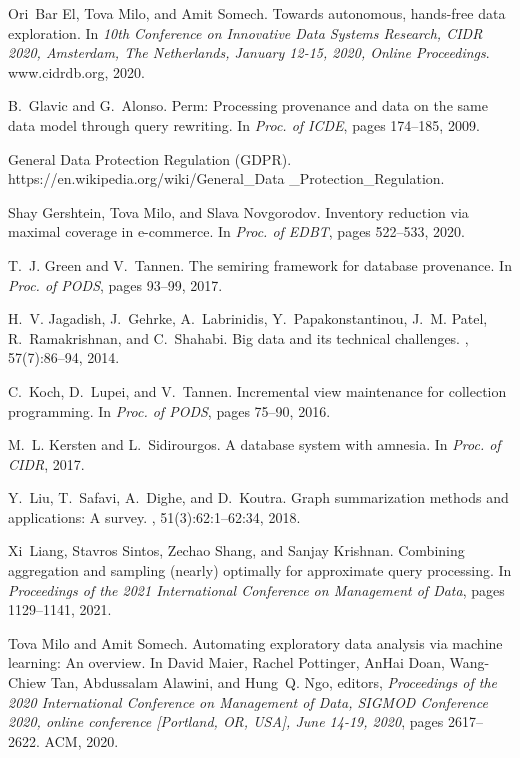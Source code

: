 \documentclass[11pt,dvipdfm]{article}
\begin{document}
\begin{thebibliography}{10}
\begin{small}
Ori~Bar El, Tova Milo, and Amit Somech.
\newblock Towards autonomous, hands-free data exploration.
\newblock In {\em 10th Conference on Innovative Data Systems Research, {CIDR}
  2020, Amsterdam, The Netherlands, January 12-15, 2020, Online Proceedings}.
  www.cidrdb.org, 2020.

B.~Glavic and G.~Alonso.
\newblock Perm: Processing provenance and data on the same data model through
  query rewriting.
\newblock In {\em Proc. of ICDE}, pages 174--185, 2009.

{General Data Protection Regulation (GDPR)}.
\newblock https://en.wikipedia.org/wiki/General\_Data \_Protection\_Regulation.

Shay Gershtein, Tova Milo, and Slava Novgorodov.
\newblock Inventory reduction via maximal coverage in e-commerce.
\newblock In {\em Proc. of EDBT}, pages 522--533, 2020.

T.~J. Green and V.~Tannen.
\newblock The semiring framework for database provenance.
\newblock In {\em Proc. of PODS}, pages 93--99, 2017.

H.~V. Jagadish, J.~Gehrke, A.~Labrinidis, Y.~Papakonstantinou, J.~M. Patel,
  R.~Ramakrishnan, and C.~Shahabi.
\newblock Big data and its technical challenges.
, 57(7):86--94, 2014.

C.~Koch, D.~Lupei, and V.~Tannen.
\newblock Incremental view maintenance for collection programming.
\newblock In {\em Proc. of PODS}, pages 75--90, 2016.

M.~L. Kersten and L.~Sidirourgos.
\newblock A database system with amnesia.
\newblock In {\em Proc. of CIDR}, 2017.

Y.~Liu, T.~Safavi, A.~Dighe, and D.~Koutra.
\newblock Graph summarization methods and applications: {A} survey.
, 51(3):62:1--62:34, 2018.

Xi~Liang, Stavros Sintos, Zechao Shang, and Sanjay Krishnan.
\newblock Combining aggregation and sampling (nearly) optimally for approximate
  query processing.
\newblock In {\em Proceedings of the 2021 International Conference on
  Management of Data}, pages 1129--1141, 2021.

Tova Milo and Amit Somech.
\newblock Automating exploratory data analysis via machine learning: An
  overview.
\newblock In David Maier, Rachel Pottinger, AnHai Doan, Wang{-}Chiew Tan,
  Abdussalam Alawini, and Hung~Q. Ngo, editors, {\em Proceedings of the 2020
  International Conference on Management of Data, {SIGMOD} Conference 2020,
  online conference [Portland, OR, USA], June 14-19, 2020}, pages 2617--2622.
  {ACM}, 2020.


\end{small}
\end{thebibliography}
\end{document}
